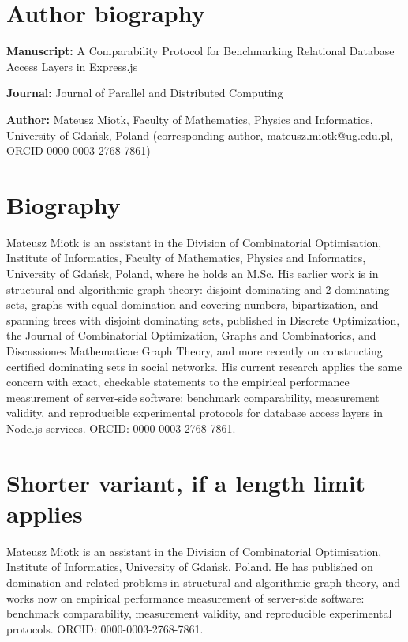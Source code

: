 \documentclass[11pt,a4paper]{article}
\begin{document}
\section*{Author biography}

\textbf{Manuscript:} A Comparability Protocol for Benchmarking Relational Database Access Layers in Express.js

\textbf{Journal:} Journal of Parallel and Distributed Computing

\textbf{Author:} Mateusz Miotk, Faculty of Mathematics, Physics and Informatics, University of Gdańsk, Poland (corresponding author, mateusz.miotk@ug.edu.pl, ORCID 0000-0003-2768-7861)

\section*{Biography}

Mateusz Miotk is an assistant in the Division of Combinatorial Optimisation, Institute of Informatics, Faculty of Mathematics, Physics and Informatics, University of Gdańsk, Poland, where he holds an M.Sc. His earlier work is in structural and algorithmic graph theory: disjoint dominating and 2-dominating sets, graphs with equal domination and covering numbers, bipartization, and spanning trees with disjoint dominating sets, published in Discrete Optimization, the Journal of Combinatorial Optimization, Graphs and Combinatorics, and Discussiones Mathematicae Graph Theory, and more recently on constructing certified dominating sets in social networks. His current research applies the same concern with exact, checkable statements to the empirical performance measurement of server-side software: benchmark comparability, measurement validity, and reproducible experimental protocols for database access layers in Node.js services. ORCID: 0000-0003-2768-7861.

\section*{Shorter variant, if a length limit applies}

Mateusz Miotk is an assistant in the Division of Combinatorial Optimisation, Institute of Informatics, University of Gdańsk, Poland. He has published on domination and related problems in structural and algorithmic graph theory, and works now on empirical performance measurement of server-side software: benchmark comparability, measurement validity, and reproducible experimental protocols. ORCID: 0000-0003-2768-7861.
\end{document}
